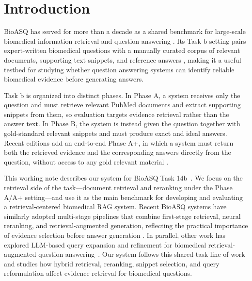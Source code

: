 \documentclass[
]{ceurart}
\begin{document}
\maketitle

\section{Introduction}
BioASQ has served for more than a decade as a shared benchmark for large-scale biomedical information retrieval and question answering \cite{tsatsaronis2015bioasq}. Its Task b setting pairs expert-written biomedical questions with a manually curated corpus of relevant documents, supporting text snippets, and reference answers \cite{krithara2023bioasqqa}, making it a useful testbed for studying whether question answering systems can identify reliable biomedical evidence before generating answers.

Task b is organized into distinct phases. In Phase A, a system receives only the question and must retrieve relevant PubMed documents and extract supporting snippets from them, so evaluation targets evidence retrieval rather than the answer text. In Phase B, the system is instead given the question together with gold-standard relevant snippets and must produce exact and ideal answers. Recent editions add an end-to-end Phase A+, in which a system must return both the retrieved evidence and the corresponding answers directly from the question, without access to any gold relevant material \cite{nentidis2025bioasq13,BioASQ2026task14bSynergy}.

This working note describes our system for BioASQ Task 14b~\cite{BioASQ2026}. We focus on the retrieval side of the task---document retrieval and reranking under the Phase A/A+ setting---and use it as the main benchmark for developing and evaluating a retrieval-centered biomedical RAG system. Recent BioASQ systems have similarly adopted multi-stage pipelines that combine first-stage retrieval, neural reranking, and retrieval-augmented generation, reflecting the practical importance of evidence selection before answer generation \cite{jonker2025bitua,han2025ncuiisr}. In parallel, other work has explored LLM-based query expansion and refinement for biomedical retrieval-augmented question answering~\cite{ateia2025selffeedback}. Our system follows this shared-task line of work and studies how hybrid retrieval, reranking, snippet selection, and query reformulation affect evidence retrieval for biomedical questions.
\end{document}

